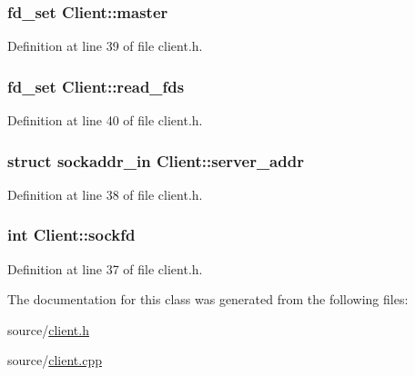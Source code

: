 \subsubsection[{\texorpdfstring{master}{master}}]{\setlength{\rightskip}{0pt plus 5cm}fd\+\_\+set Client\+::master\hspace{0.3cm}{\ttfamily [private]}}\hypertarget{class_client_a56c611a99e0ba2a2efaddeb9ae021618}{}\label{class_client_a56c611a99e0ba2a2efaddeb9ae021618}


Definition at line 39 of file client.\+h.

\subsubsection[{\texorpdfstring{read\+\_\+fds}{read_fds}}]{\setlength{\rightskip}{0pt plus 5cm}fd\+\_\+set Client\+::read\+\_\+fds\hspace{0.3cm}{\ttfamily [private]}}\hypertarget{class_client_a3631a848d923649af981576df2c83506}{}\label{class_client_a3631a848d923649af981576df2c83506}


Definition at line 40 of file client.\+h.

\subsubsection[{\texorpdfstring{server\+\_\+addr}{server_addr}}]{\setlength{\rightskip}{0pt plus 5cm}struct sockaddr\+\_\+in Client\+::server\+\_\+addr\hspace{0.3cm}{\ttfamily [private]}}\hypertarget{class_client_a3787f155329f63a3bae120e9deca92d6}{}\label{class_client_a3787f155329f63a3bae120e9deca92d6}


Definition at line 38 of file client.\+h.

\subsubsection[{\texorpdfstring{sockfd}{sockfd}}]{\setlength{\rightskip}{0pt plus 5cm}int Client\+::sockfd\hspace{0.3cm}{\ttfamily [private]}}\hypertarget{class_client_ab0cf9b759ba4da79ccb0a64242d944c4}{}\label{class_client_ab0cf9b759ba4da79ccb0a64242d944c4}


Definition at line 37 of file client.\+h.



The documentation for this class was generated from the following files\+:\begin{DoxyCompactItemize}
\item 
source/\hyperlink{client_8h}{client.\+h}\item 
source/\hyperlink{client_8cpp}{client.\+cpp}\end{DoxyCompactItemize}
